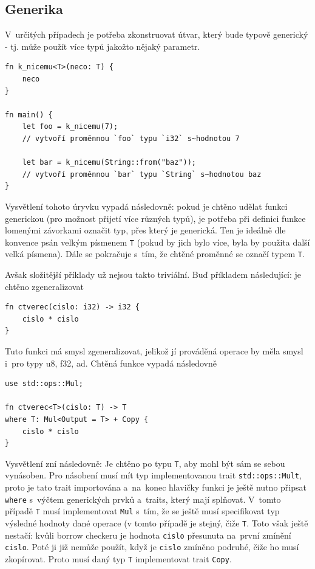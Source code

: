 \documentclass[a4paper, 12pt]{article} %
\newcommand{\rust}[1]{\texttt{#1}}
\begin{document}
    \subsection{Generika}
        V~určitých případech je potřeba zkonstruovat útvar, který bude typově generický - tj. může použít více typů jakožto nějaký parametr.
        \begin{verbatim}
fn k_nicemu<T>(neco: T) {
    neco
}

fn main() {
    let foo = k_nicemu(7);
    // vytvoří proměnnou `foo` typu `i32` s~hodnotou 7
    
    let bar = k_nicemu(String::from("baz"));
    // vytvoří proměnnou `bar` typu `String` s~hodnotou baz 
}
        \end{verbatim}
        
        Vysvětlení tohoto úryvku vypadá následovně: pokud je chtěno udělat funkci generickou (pro možnost přijetí více různých typů), je potřeba při definici funkce lomenými závorkami označit typ, přes který je generická. Ten je ideálně dle konvence psán velkým písmenem \texttt{T} (pokud by jich bylo více, byla by použita další velká písmena). Dále se pokračuje s~tím, že chtěné proměnné se označí typem \rust{T}.
        
        Avšak složitější příklady už nejsou takto triviální. Buď příkladem následující: je chtěno zgeneralizovat
        \begin{verbatim}
fn ctverec(cislo: i32) -> i32 {
    cislo * cislo
}
        \end{verbatim}
        
        Tuto funkci má smysl zgeneralizovat, jelikož jí prováděná operace by měla smysl i~pro typy u8, f32, ad. Chtěná funkce vypadá následovně
        \begin{verbatim}
use std::ops::Mul;

fn ctverec<T>(cislo: T) -> T
where T: Mul<Output = T> + Copy {
    cislo * cislo
}
        \end{verbatim}
        
        Vysvětlení zní následovně: Je chtěno po typu \texttt{T}, aby mohl být sám se sebou vynásoben. Pro násobení musí mít typ implementovanou trait \rust{std::ops::Mult}, proto je tato trait importována a~na~konec hlavičky funkci je ještě nutno připsat \rust{where} s~výčtem generických prvků a~traits, který mají splňovat. V~tomto případě \texttt{T} musí implementovat \rust{Mul} s~tím, že se ještě musí specifikovat typ výsledné hodnoty dané operace (v tomto případě je stejný, čiže \rust{T}. Toto však ještě nestačí: kvůli borrow checkeru je hodnota \rust{cislo} přesunuta na~první zmínění \texttt{cislo}. Poté ji již nemůže použít, když je \texttt{cislo} zmíněno podruhé, čiže ho musí zkopírovat. Proto musí daný typ \texttt{T} implementovat trait \rust{Copy}.
        
\end{document}
